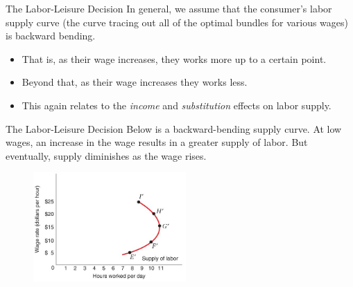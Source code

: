 \documentclass[12pt,t]{beamer}
\begin{document}
\begin{frame}{The Labor-Leisure Decision}
  In general, we assume that the consumer's labor supply curve (the curve tracing out all of the optimal bundles for various wages) is backward bending.
  
  \bigskip
  \begin{itemize}
    \item That is, as their wage increases, they works more up to a certain point.

    \item Beyond that, as their wage increases they works less.

    \item This again relates to the \textit{income} and \textit{substitution} effects on labor supply.
  \end{itemize}
\end{frame}

\begin{frame}{The Labor-Leisure Decision}
  Below is a backward-bending supply curve. At low wages, an increase in the wage results in a greater supply of labor. But eventually, supply diminishes as the wage rises.

  \begin{figure}
    \includegraphics[width=220px]{figures/fig5_25.jpg}
  \end{figure}
\end{frame}
\end{document}
